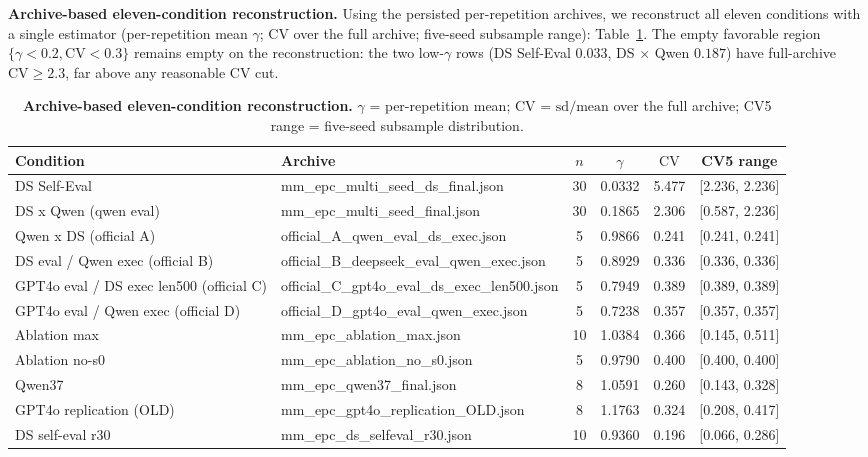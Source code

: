 \documentclass[11pt]{article}
\begin{document}
\noindent\textbf{Archive-based eleven-condition reconstruction.} Using the persisted per-repetition archives, we reconstruct all eleven conditions with a single estimator (per-repetition mean $\gamma$; $\mathrm{CV}$ over the full archive; five-seed subsample range): Table~\ref{tab:recon}. The empty favorable region $\{\gamma < 0.2, \mathrm{CV} < 0.3\}$ remains empty on the reconstruction: the two low-$\gamma$ rows (DS Self-Eval $0.033$, DS $\times$ Qwen $0.187$) have full-archive $\mathrm{CV} \geq 2.3$, far above any reasonable $\mathrm{CV}$ cut.

\begin{table}[t]
\centering
\caption{\textbf{Archive-based eleven-condition reconstruction.} $\gamma$ = per-repetition mean; $\mathrm{CV}$ = $\mathrm{sd}/\mathrm{mean}$ over the full archive; CV5 range = five-seed subsample distribution.}
\label{tab:recon}
\small
\begin{tabular}{@{}llcccc@{}}
\toprule
Condition & Archive & $n$ & $\gamma$ & $\mathrm{CV}$ & CV5 range \\
\midrule
    DS Self-Eval & mm\_epc\_multi\_seed\_ds\_final.json & 30 & 0.0332 & 5.477 & [2.236, 2.236] \\
    DS x Qwen (qwen eval) & mm\_epc\_multi\_seed\_final.json & 30 & 0.1865 & 2.306 & [0.587, 2.236] \\
    Qwen x DS (official A) & official\_A\_qwen\_eval\_ds\_exec.json & 5 & 0.9866 & 0.241 & [0.241, 0.241] \\
    DS eval / Qwen exec (official B) & official\_B\_deepseek\_eval\_qwen\_exec.json & 5 & 0.8929 & 0.336 & [0.336, 0.336] \\
    GPT4o eval / DS exec len500 (official C) & official\_C\_gpt4o\_eval\_ds\_exec\_len500.json & 5 & 0.7949 & 0.389 & [0.389, 0.389] \\
    GPT4o eval / Qwen exec (official D) & official\_D\_gpt4o\_eval\_qwen\_exec.json & 5 & 0.7238 & 0.357 & [0.357, 0.357] \\
    Ablation max & mm\_epc\_ablation\_max.json & 10 & 1.0384 & 0.366 & [0.145, 0.511] \\
    Ablation no-s0 & mm\_epc\_ablation\_no\_s0.json & 5 & 0.9790 & 0.400 & [0.400, 0.400] \\
    Qwen37 & mm\_epc\_qwen37\_final.json & 8 & 1.0591 & 0.260 & [0.143, 0.328] \\
    GPT4o replication (OLD) & mm\_epc\_gpt4o\_replication\_OLD.json & 8 & 1.1763 & 0.324 & [0.208, 0.417] \\
    DS self-eval r30 & mm\_epc\_ds\_selfeval\_r30.json & 10 & 0.9360 & 0.196 & [0.066, 0.286] \\
\bottomrule
\end{tabular}
\end{table}
\end{document}

